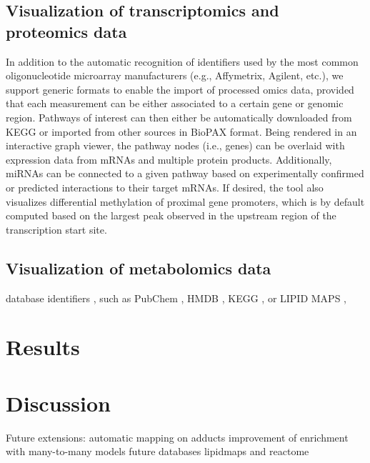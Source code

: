 \documentclass[final,5p,times,twocolumn]{elsarticle}
\begin{document}
\subsection{Visualization of transcriptomics and proteomics data}
In addition to the automatic recognition of identifiers used by the most common oligonucleotide microarray manufacturers (e.g., Affymetrix, Agilent, etc.), we support generic formats to enable the import of processed omics data, provided that each measurement can be either associated to a certain gene or genomic region. Pathways of interest can then either be automatically downloaded from KEGG or imported from other sources in BioPAX format. Being rendered in an interactive graph viewer, the pathway nodes (i.e., genes) can be overlaid with expression data from mRNAs and multiple protein products. Additionally, miRNAs can be connected to a given pathway based on experimentally confirmed or predicted interactions to their target mRNAs. If desired, the tool also visualizes differential methylation of proximal gene promoters, which is by default computed based on the largest peak observed in the upstream region of the transcription start site.

\subsection{Visualization of metabolomics data}
database identifiers , such as PubChem \cite{Wang2009}, HMDB \cite{Wishart2009}, KEGG \cite{Kanehisa2006}, or LIPID MAPS \cite{Sud2007},
\section{Results}

\section{Discussion}
Future extensions: automatic mapping on adducts
improvement of enrichment with many-to-many models
future databases lipidmaps\cite{Sud2007} and reactome \cite{Eustachio2011}


\end{document}
